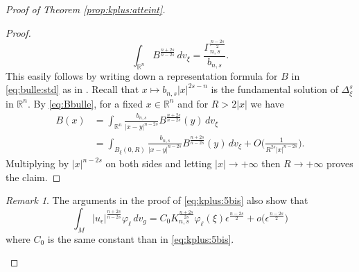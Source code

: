 \documentclass[10pt]{amsart}
\numberwithin{equation}{section}
\newcommand{\R}{\mathbb{R}}
\def\ep{{\varepsilon}}
\def \ep{\epsilon}
\theoremstyle{plain}
\theoremstyle{remark}
\newtheorem{rem}{Remark}[section]
\begin{document}
\begin{proof}[Proof of Theorem \ref{prop:kplus:atteint}]
\begin{proof}
$$  \int_{\R^n} B^{\frac{n+2s}{n-2s}} \, dv_\xi =  \frac{\Gamma_{n,s}^{\frac{n-2s}{2}}}{b_{n,s}}. $$
This easily follows by writing down a representation formula for $B$ in \eqref{eq:bulle:std} as in \cite[Lemma 2.1]{Premoselli13}. Recall that $x \mapsto b_{n,s} |x|^{2s-n}$ is the fundamental solution of $\Delta_\xi^s$ in $\R^n$. By \eqref{eq:Bbulle}, for a fixed $x \in \R^n$ and for $R > 2 |x|$ we have
$$\begin{aligned} 
B(x) &= \int_{\R^n} \frac{b_{n,s}}{|x-y|^{n-2s}} B^{\frac{n+2s}{n-2s}}(y) \, dv_\xi \\
& =  \int_{B_{\xi}(0,R)} \frac{b_{n,s}}{|x-y|^{n-2s}}  B^{\frac{n+2s}{n-2s}}(y) \, dv_\xi + O\Big( \frac{1}{R^{2s} |x|^{n-2s}} \Big).
\end{aligned} $$
Multiplying by $|x|^{n-2s}$ on both sides and letting $|x| \to + \infty$ then $R \to + \infty$ proves the claim.
\end{proof}

\begin{rem}
The arguments in the proof of \eqref{eq:kplus:5bis} also show that  
$$\int_{M} |u_{\ep}|^{\frac{n+2s}{n-2s}}\varphi_{\ell}\, dv_g  = C_0 K_{n,s}^{\frac{n+2s}{2s}}  \varphi_{\ell}(\xi) \ep^{\frac{n-2s}{2}}  + o \big(\ep^{\frac{n-2s}{2}} \big) $$
where $C_0$ is the same constant than in \eqref{eq:kplus:5bis}.
\end{rem}


\medskip


\end{proof}
\end{document}
